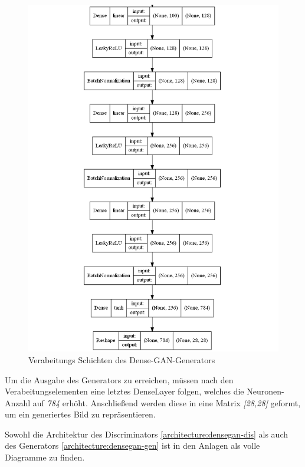\begin{figure}[H]
	\centering
	\includegraphics[width=0.6\textheight]{kapitel/5_ergebnisse/architectures/densegan_generator/output.png}
	\caption{Verabeitungs Schichten des Dense-GAN-Generators}
	\label{architecture:densegan-gen-dense}
\end{figure}

Um die Ausgabe des Generators zu erreichen, müssen nach den Verabeitungselementen eine letztes DenseLayer folgen, welches die Neuronen-Anzahl auf \textit{784} erhöht.
Anschließend werden diese in eine Matrix \textit{[28,28]} geformt, um ein generiertes Bild zu repräsentieren.
\newline

Sowohl die Architektur des Discriminators \cref{architecture:densegan-dis} als auch des Generators \cref{architecture:densegan-gen} ist in den Anlagen als volle Diagramme zu finden.

